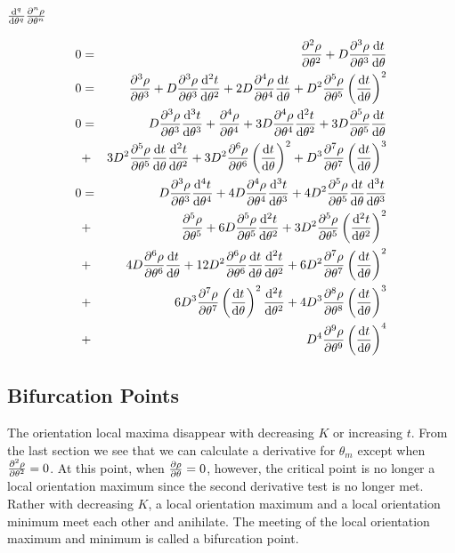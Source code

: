 \documentclass[11pt]{article} %
\begin{document}
\subsubsection{$ \dv[q]{ }{\theta} \pdv[n]{\rho}{\theta} $}

\begin{eqnarray}
	0 & = & \pdv[2]{\rho}{\theta}  + D \pdv[3]{\rho}{\theta} \dv{t}{\theta} \\
	0 & = & \pdv[3]{\rho}{\theta}  + D \pdv[3]{\rho}{\theta} \dv[2]{t}{\theta}  + 2 D \pdv[4]{\rho}{\theta} \dv{t}{\theta}  + D^2 \pdv[5]{\rho}{\theta} \left(\dv{t}{\theta}\right)^2 \\
	0 & = & D \pdv[3]{\rho}{\theta} \dv[3]{t}{\theta}  + \pdv[4]{\rho}{\theta}  + 3 D \pdv[4]{\rho}{\theta} \dv[2]{t}{\theta}  + 3 D \pdv[5]{\rho}{\theta} \dv{t}{\theta}  \\
	& + & 3 D^2 \pdv[5]{\rho}{\theta} \dv{t}{\theta} \dv[2]{t}{\theta}  + 3 D^2 \pdv[6]{\rho}{\theta} \left(\dv{t}{\theta}\right)^2  + D^3 \pdv[7]{\rho}{\theta} \left(\dv{t}{\theta}\right)^3 \\
	0 & = & D \pdv[3]{\rho}{\theta} \dv[4]{t}{\theta}  + 4 D \pdv[4]{\rho}{\theta} \dv[3]{t}{\theta}  + 4 D^2 \pdv[5]{\rho}{\theta} \dv{t}{\theta} \dv[3]{t}{\theta}  \\
	& + & \pdv[5]{\rho}{\theta}  + 6 D \pdv[5]{\rho}{\theta} \dv[2]{t}{\theta}  + 3 D^2 \pdv[5]{\rho}{\theta} \left(\dv[2]{t}{\theta}\right)^2  \\ 
	& + & 4 D \pdv[6]{\rho}{\theta} \dv{t}{\theta}  + 12 D^2 \pdv[6]{\rho}{\theta} \dv{t}{\theta} \dv[2]{t}{\theta}  + 6 D^2 \pdv[7]{\rho}{\theta} \left(\dv{t}{\theta}\right)^2\\
	& + & 6 D^3 \pdv[7]{\rho}{\theta} \left(\dv{t}{\theta}\right)^2 \dv[2]{t}{\theta}  + 4 D^3 \pdv[8]{\rho}{\theta} \left(\dv{t}{\theta}\right)^3  \\
	& + & D^4 \pdv[9]{\rho}{\theta} \left(\dv{t}{\theta}\right)^4 
\end{eqnarray}

\subsection{Bifurcation Points}

The orientation local maxima disappear with decreasing $ K $ or increasing $ t $. From the last section we see that we can calculate a derivative for $ \theta_m $ except when $ \pdv[2]{\rho}{\theta}  = 0 $. At this point, when $ \pdv{\rho}{\theta} = 0 $, however, the critical point is no longer a local orientation maximum since the second derivative test is no longer met. Rather with decreasing $ K $, a local orientation maximum and a local orientation minimum meet each other and anihilate. The meeting of the local orientation maximum and minimum is called a bifurcation point.
\end{document}
